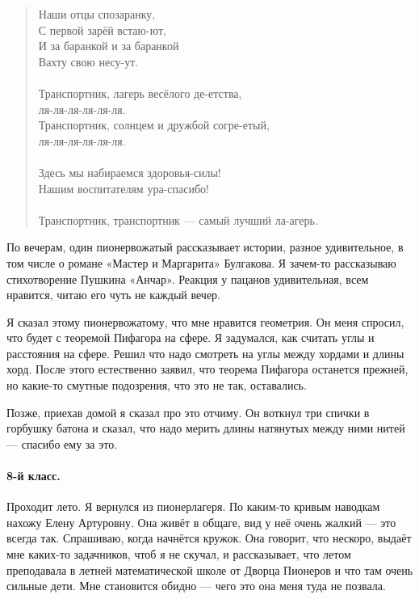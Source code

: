 \documentclass{book}
\begin{document}
\begin{verse}
Наши отцы спозаранку,
\\
С первой зарёй встаю-ют,
\\
И за баранкой и за баранкой
\\
Вахту свою несу-ут.
\\
\ 
\\
Транспортник, лагерь весёлого де-етства,
\\ 
\qquad ля-ля-ля-ля-ля-ля.
\\
Транспортник, солнцем и дружбой согре-етый,
\\ 
\qquad ля-ля-ля-ля-ля-ля.
\\
\ 
\\
Здесь мы набираемся здоровья-силы!
\\
Нашим воспитателям ура-спасибо!
\\
\ 
\\
Транспортник, транспортник --- самый лучший ла-агерь.
\end{verse}

По вечерам, один пионервожатый рассказывает истории, разное удивительное, в том числе о романе «Мастер и Маргарита» Булгакова.
Я зачем-то рассказываю стихотворение Пушкина «Анчар». 
Реакция у пацанов удивительная, всем нравится, читаю его чуть не каждый вечер.

Я сказал этому пионервожатому, что мне нравится геометрия.
Он меня спросил, что будет с теоремой Пифагора на сфере.
Я задумался, как считать углы и расстояния на сфере. 
Решил что надо смотреть на углы между хордами и длины хорд.
После этого естественно заявил, что теорема Пифагора останется прежней, но какие-то смутные подозрения, что это не так, оставались.

Позже, приехав домой я сказал про это отчиму.
Он воткнул три спички в горбушку батона и сказал, что надо мерить длины натянутых между ними нитей --- спасибо ему за это.



\paragraph{8-й класс.}
Проходит лето. 
Я вернулся из пионерлагеря.
По каким-то кривым наводкам нахожу Елену Артуровну.
Она живёт в общаге, вид у неё очень жалкий --- это всегда так.
Спрашиваю, когда начнётся кружок.
Она говорит, что нескоро,
выдаёт мне каких-то задачников, чтоб я не скучал,
и рассказывает, что летом преподавала в летней математической школе от Дворца Пионеров и что там очень сильные дети.
Мне становится обидно --- чего это она меня туда не позвала.
\end{document}
